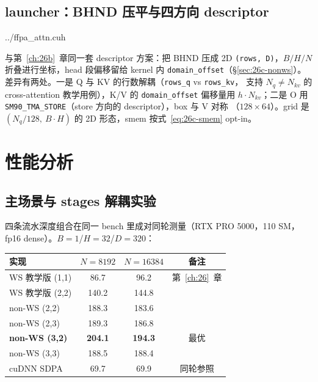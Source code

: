 \subsection{launcher：BHND 压平与四方向 descriptor}\label{sec:26c-launcher}

\begin{lstinputlisting}[linerange={1277-1304},firstnumber=auto,
  title={ffpa\_attn.cuh L1277-1304（launcher：2D 压平 + 四方向 TMA + opt-in smem）}]{../ffpa_attn.cuh}
\end{lstinputlisting}

与第~\ref{ch:26b}~章同一套 descriptor 方案：把 BHND 压成 2D
\texttt{(rows, D)}，$B/H/N$ 折叠进行坐标，head 段偏移留给 kernel 内
\texttt{domain\_offset}（\S\ref{sec:26c-nonws}）。差异有两处。一是
Q 与 KV 的行数解耦（\texttt{rows\_q} vs \texttt{rows\_kv}，
支持 $N_q \ne N_{kv}$ 的 cross-attention 教学用例），K/V 的
\texttt{domain\_offset} 偏移量用 $h \cdot N_{kv}$；二是 O 用
\texttt{SM90\_TMA\_STORE}（store 方向的 descriptor），box 与 V 对称
（$128\times64$）。grid 是 $(N_q/128,\ B\cdot H)$ 的 2D 形态，smem
按式~\eqref{eq:26c-smem} opt-in。

\section{性能分析}\label{sec:26c-perf}

\subsection{主场景与 stages 解耦实验}

四条流水深度组合在同一 bench 里成对同轮测量（RTX PRO 5000，110 SM，
fp16 dense）。$B{=}1$/$H{=}32$/$D{=}320$：

\begin{center}
\begin{tabular}{lccc}
\toprule
实现 & $N{=}8192$ & $N{=}16384$ & 备注 \\
\midrule
WS 教学版 (1,1) & 86.7 & 96.2 & 第~\ref{ch:26}~章 \\
WS 教学版 (2,2) & 140.2 & 144.8 & \\
non-WS (2,2) & 188.3 & 183.6 & \\
non-WS (2,3) & 189.3 & 186.8 & \\
\textbf{non-WS (3,2)} & \textbf{204.1} & \textbf{194.3} & 最优 \\
non-WS (3,3) & 188.5 & 188.4 & \\
cuDNN SDPA & 69.7 & 69.9 & 同轮参照 \\
\bottomrule
\end{tabular}
\end{center}

